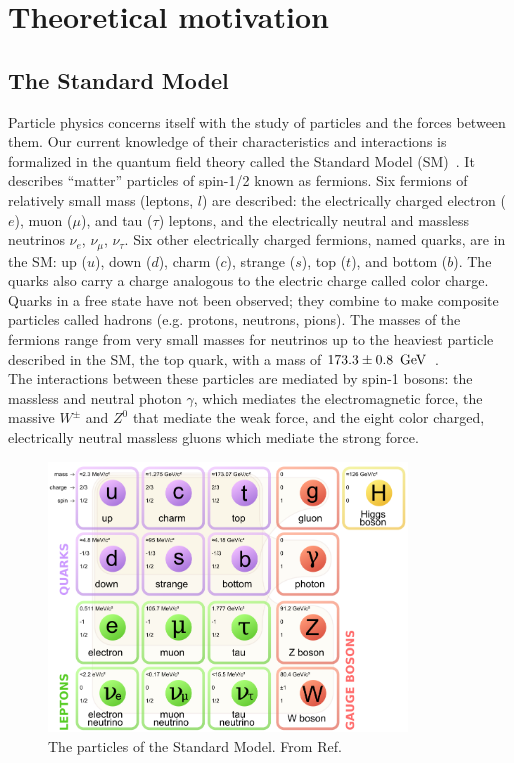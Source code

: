 \clearpage
\section{Theoretical motivation\label{sec:theory}}

\subsection{The Standard Model\label{sec:SM}}

Particle physics concerns itself with the study of particles and the 
forces between them. Our current knowledge of their characteristics and 
interactions is formalized in the quantum field theory called the Standard Model 
(SM)~\cite{bettini2014introduction,griffiths2008introduction}.
It describes ``matter'' particles of spin-1/2 known as 
fermions. Six fermions of relatively small mass (leptons, $l$) are described:
the electrically charged electron ($e$), muon ($\mu$), and tau ($\tau$) 
leptons, and the electrically neutral and massless neutrinos 
$\nu_{e}$, $\nu_{\mu}$, $\nu_{\tau}$.  
Six other electrically charged 
fermions, named quarks, are in the SM: up ($u$), down ($d$), 
charm ($c$), strange ($s$), top ($t$), and bottom ($b$). The quarks also carry
a charge analogous to the electric charge called color charge. Quarks in a 
free state have not been observed; they combine to make composite
particles called hadrons (e.g. protons, neutrons, pions). The masses of the 
fermions range from very small masses for neutrinos up to the heaviest 
particle described in the SM, the top quark, with a mass of $173.3\pm0.8~\,\text{Ge\hspace{-.08em}V}$~\cite{ATLAS:2014wva}. \\
\indent The interactions between these particles are mediated by spin-1 bosons: 
the massless and neutral photon $\gamma$, which mediates the electromagnetic force, 
the massive $W^\pm$ and $Z^0$ that mediate the weak force, and the eight color 
charged, electrically neutral massless gluons which mediate the strong force.

\begin{figure}[h!t]
  \begin{center}
       \includegraphics[width=0.85\textwidth,]{figures/Standard_Model_of_Elementary_Particles.png}
       \caption{The particles of the Standard Model. From Ref.~\cite{wikiSM}}
    \label{fig:SM-particles}
  \end{center}
\end{figure}

